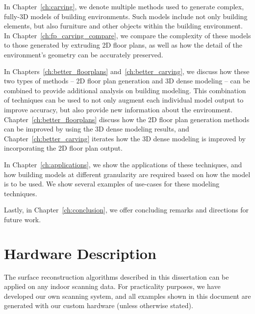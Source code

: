 \documentclass[12pt,onecolumn,oneside]{book}
\begin{document}
In Chapter~\ref{ch:carving}, we denote multiple methods used to generate complex, fully-3D models of building environments.  Such models include not only building elements, but also furniture and other objects within the building environment.  In Chapter~\ref{ch:fp_carving_compare}, we compare the complexity of these models to those generated by extruding 2D floor plans, as well as how the detail of the environment's geometry can be accurately preserved.

In Chapters~\ref{ch:better_floorplans} and~\ref{ch:better_carving}, we discuss how these two types of methods -- 2D floor plan generation and 3D dense modeling -- can be combined to provide additional analysis on building modeling.  This combination of techniques can be used to not only augment each individual model output to improve accuracy, but also provide new information about the environment.  Chapter~\ref{ch:better_floorplans} discuss how the 2D floor plan generation methods can be improved by using the 3D dense modeling results, and Chapter~\ref{ch:better_carving} iterates how the 3D dense modeling is improved by incorporating the 2D floor plan output.

In Chapter~\ref{ch:applications}, we show the applications of these techniques, and how building models at different granularity are required based on how the model is to be used.  We show several examples of use-cases for these modeling techniques.

Lastly, in Chapter~\ref{ch:conclusion}, we offer concluding remarks and directions for future work.


\chapter{Hardware Description}
\label{ch:hardware}

The surface reconstruction algorithms described in this dissertation can be applied on any indoor scanning data.  For practicality purposes, we have developed our own scanning system, and all examples shown in this document are generated with our custom hardware (unless otherwise stated).
\end{document}

